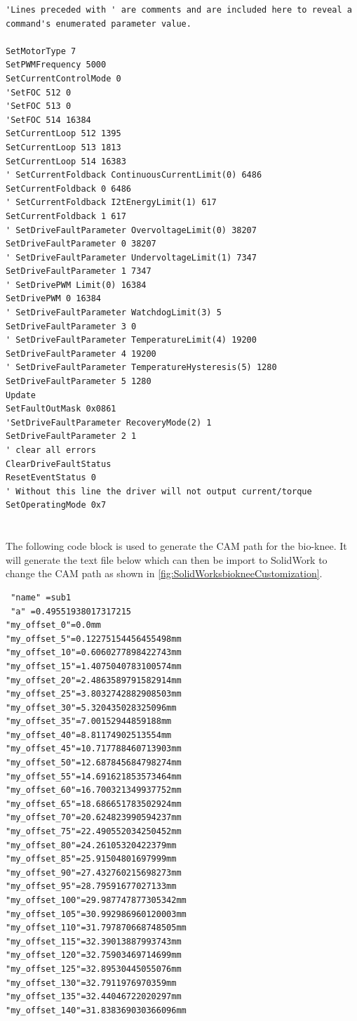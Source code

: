 \begin{lstlisting}
'Lines preceded with ' are comments and are included here to reveal a command's enumerated parameter value.

SetMotorType 7
SetPWMFrequency 5000
SetCurrentControlMode 0
'SetFOC 512 0 
'SetFOC 513 0 
'SetFOC 514 16384 
SetCurrentLoop 512 1395 
SetCurrentLoop 513 1813 
SetCurrentLoop 514 16383 
' SetCurrentFoldback ContinuousCurrentLimit(0) 6486 
SetCurrentFoldback 0 6486 
' SetCurrentFoldback I2tEnergyLimit(1) 617 
SetCurrentFoldback 1 617 
' SetDriveFaultParameter OvervoltageLimit(0) 38207 
SetDriveFaultParameter 0 38207 
' SetDriveFaultParameter UndervoltageLimit(1) 7347 
SetDriveFaultParameter 1 7347 
' SetDrivePWM Limit(0) 16384 
SetDrivePWM 0 16384 
' SetDriveFaultParameter WatchdogLimit(3) 5 
SetDriveFaultParameter 3 0 
' SetDriveFaultParameter TemperatureLimit(4) 19200 
SetDriveFaultParameter 4 19200 
' SetDriveFaultParameter TemperatureHysteresis(5) 1280 
SetDriveFaultParameter 5 1280 
Update 
SetFaultOutMask 0x0861
'SetDriveFaultParameter RecoveryMode(2) 1 
SetDriveFaultParameter 2 1 
' clear all errors
ClearDriveFaultStatus
ResetEventStatus 0
' Without this line the driver will not output current/torque
SetOperatingMode 0x7

\end{lstlisting}

\chapter{}

The following code block is used to generate the CAM path for the bio-knee. It will generate the text file below which can then be import to SolidWork to change the CAM path as shown in \autoref{fig:SolidWorksbiokneeCustomization}. 





\begin{lstlisting}
 "name" =sub1
 "a" =0.49551938017317215
"my_offset_0"=0.0mm 
"my_offset_5"=0.12275154456455498mm 
"my_offset_10"=0.6060277898422743mm 
"my_offset_15"=1.4075040783100574mm 
"my_offset_20"=2.4863589791582914mm 
"my_offset_25"=3.8032742882908503mm 
"my_offset_30"=5.320435028325096mm 
"my_offset_35"=7.00152944859188mm 
"my_offset_40"=8.81174902513554mm 
"my_offset_45"=10.717788460713903mm 
"my_offset_50"=12.687845684798274mm 
"my_offset_55"=14.691621853573464mm 
"my_offset_60"=16.700321349937752mm 
"my_offset_65"=18.686651783502924mm 
"my_offset_70"=20.624823990594237mm 
"my_offset_75"=22.490552034250452mm 
"my_offset_80"=24.26105320422379mm 
"my_offset_85"=25.91504801697999mm 
"my_offset_90"=27.432760215698273mm 
"my_offset_95"=28.79591677027133mm 
"my_offset_100"=29.987747877305342mm 
"my_offset_105"=30.992986960120003mm 
"my_offset_110"=31.797870668748505mm 
"my_offset_115"=32.39013887993743mm 
"my_offset_120"=32.75903469714699mm 
"my_offset_125"=32.89530445055076mm 
"my_offset_130"=32.7911976970359mm 
"my_offset_135"=32.44046722020297mm 
"my_offset_140"=31.838369030366096mm 
\end{lstlisting}


